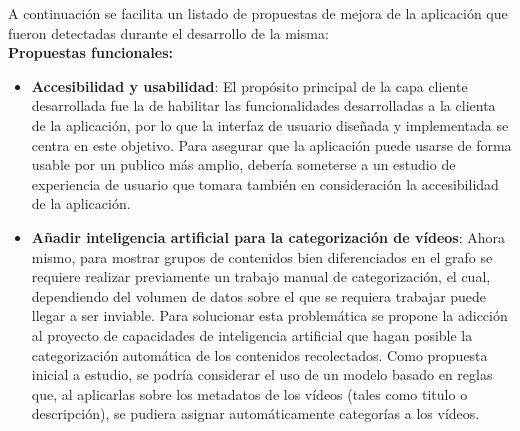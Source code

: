\documentclass[11pt,a4paper]{article}
\begin{document}
A continuación se facilita un listado de propuestas de mejora de la aplicación que fueron detectadas durante el desarrollo de la misma:
\\

\noindent\textbf{Propuestas funcionales:}
\begin{itemize}
\item \textbf{Accesibilidad y usabilidad}: El propósito principal de la capa cliente desarrollada fue la de habilitar las funcionalidades desarrolladas a la clienta de la aplicación, por lo que la interfaz de usuario diseñada y implementada se centra en este objetivo. Para asegurar que la aplicación puede usarse de forma usable por un publico más amplio, debería someterse a un estudio de experiencia de usuario que tomara también en consideración la accesibilidad de la aplicación.
\item \textbf{Añadir inteligencia artificial para la categorización de vídeos}: Ahora mismo, para mostrar grupos de contenidos bien diferenciados en el grafo se requiere realizar previamente un trabajo manual de categorización, el cual, dependiendo del volumen de datos sobre el que se requiera trabajar puede llegar a ser inviable. Para solucionar esta problemática se propone la adicción al proyecto de capacidades de inteligencia artificial que hagan posible la categorización automática de los contenidos recolectados. Como propuesta inicial a estudio, se podría considerar el uso de un modelo basado en reglas que, al aplicarlas sobre los metadatos de los vídeos (tales como titulo o descripción), se pudiera asignar automáticamente categorías a los vídeos.
\end{itemize}
\medskip 
\end{document}
